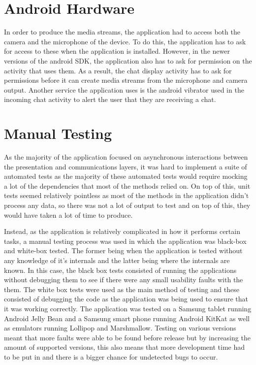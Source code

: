 \documentclass[]{report}
\begin{document}
		\section{Android Hardware}
		In order to produce the media streams, the application had to access both the camera and the microphone of the device. To do this, the application has to ask for access to these when the application is installed. However, in the newer versions of the android SDK, the application also has to ask for permission on the activity that uses them. As a result, the chat display activity has to ask for permissions before it can create media streams from the microphone and camera output. Another service the application uses is the android vibrator used in the incoming chat activity to alert the user that they are receiving a chat.
		
		\section{Manual Testing}
		As the majority of the application focused on asynchronous interactions between the presentation and communications layers, it was hard to implement a suite of automated tests as the majority of these automated tests would require mocking a lot of the dependencies that most of the methods relied on. On top of this, unit tests seemed relatively pointless as most of the methods in the application didn't process any data, so there was not a lot of output to test and on top of this, they would have taken a lot of time to produce. 
		
		Instead, as the application is relatively complicated in how it performs certain tasks, a manual testing process was used in which the application was black-box and white-box tested. The former being when the application is tested without any knowledge of it's internals and the latter being where the internals are known. In this case, the black box tests consisted of running the applications without debugging them to see if there were any small usability faults with the them. The white box tests were used as the main method of testing and these consisted of debugging the code as the application was being used to ensure that it was working correctly. The application was tested on a Samsung tablet running Android Jelly Bean and a Samsung smart phone running Android KitKat as well as emulators running Lollipop and Marshmallow. Testing on various versions meant that more faults were able to be found before release but by increasing the amount of supported versions, this also means that more development time had to be put in and there is a bigger chance for undetected bugs to occur.
		
\end{document}
